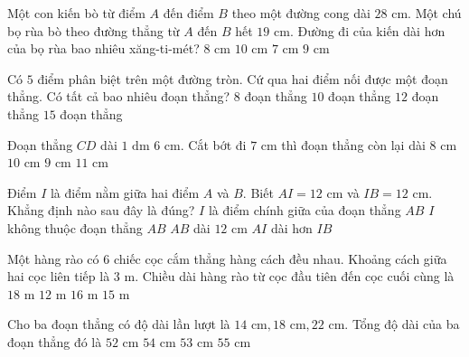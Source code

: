 \begin{ex} %
Một con kiến bò từ điểm $A$ đến điểm $B$ theo một đường cong dài $28\text{ cm}$. Một chú bọ rùa bò theo đường thẳng từ $A$ đến $B$ hết $19\text{ cm}$. Đường đi của kiến dài hơn của bọ rùa bao nhiêu xăng-ti-mét?
\choice
{$8\text{ cm}$}
{$10\text{ cm}$}
{$7\text{ cm}$}
{\True $9\text{ cm}$}
\end{ex}

\begin{ex} %
Có $5$ điểm phân biệt trên một đường tròn. Cứ qua hai điểm nối được một đoạn thẳng. Có tất cả bao nhiêu đoạn thẳng?
\choice
{$8$ đoạn thẳng}
{\True $10$ đoạn thẳng}
{$12$ đoạn thẳng}
{$15$ đoạn thẳng}
\end{ex}

\begin{ex} %
Đoạn thẳng $CD$ dài $1\text{ dm } 6\text{ cm}$. Cắt bớt đi $7\text{ cm}$ thì đoạn thẳng còn lại dài
\choice
{$8\text{ cm}$}
{$10\text{ cm}$}
{\True $9\text{ cm}$}
{$11\text{ cm}$}
\end{ex}

\begin{ex} %
Điểm $I$ là điểm nằm giữa hai điểm $A$ và $B$. Biết $AI = 12\text{ cm}$ và $IB = 12\text{ cm}$. Khẳng định nào sau đây là đúng?
\choice
{\True $I$ là điểm chính giữa của đoạn thẳng $AB$}
{$I$ không thuộc đoạn thẳng $AB$}
{$AB$ dài $12\text{ cm}$}
{$AI$ dài hơn $IB$}
\end{ex}

\begin{ex} %
Một hàng rào có $6$ chiếc cọc cắm thẳng hàng cách đều nhau. Khoảng cách giữa hai cọc liên tiếp là $3\text{ m}$. Chiều dài hàng rào từ cọc đầu tiên đến cọc cuối cùng là
\choice
{$18\text{ m}$}
{$12\text{ m}$}
{$16\text{ m}$}
{\True $15\text{ m}$}
\end{ex}

\begin{ex} %
Cho ba đoạn thẳng có độ dài lần lượt là $14\text{ cm}, 18\text{ cm}, 22\text{ cm}$. Tổng độ dài của ba đoạn thẳng đó là
\choice
{$52\text{ cm}$}
{\True $54\text{ cm}$}
{$53\text{ cm}$}
{$55\text{ cm}$}
\end{ex}

